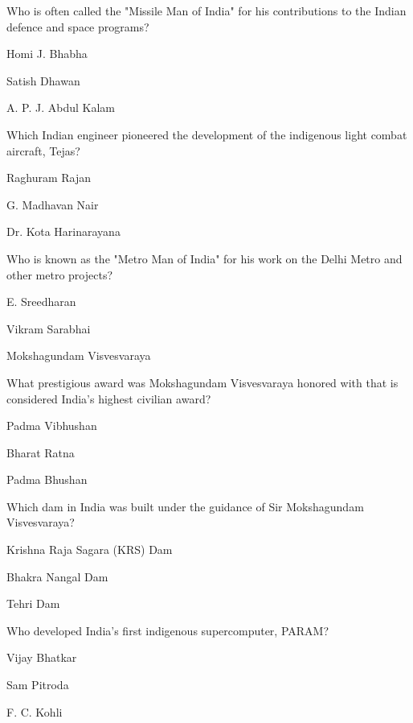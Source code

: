 \begin{enhancedmcq}{Who is often called the "Missile Man of India" for his contributions to the Indian defence and space programs?}
\item Homi J. Bhabha
\item Satish Dhawan
\item A. P. J. Abdul Kalam

\end{enhancedmcq}
\begin{enhancedmcq}{Which Indian engineer pioneered the development of the indigenous light combat aircraft, Tejas?}
\item Raghuram Rajan
\item G. Madhavan Nair
\item Dr. Kota Harinarayana

\end{enhancedmcq}
\begin{enhancedmcq}{Who is known as the "Metro Man of India" for his work on the Delhi Metro and other metro projects?}
\item E. Sreedharan
\item Vikram Sarabhai
\item Mokshagundam Visvesvaraya

\end{enhancedmcq}
\begin{enhancedmcq}{What prestigious award was Mokshagundam Visvesvaraya honored with that is considered India's highest civilian award?}
\item Padma Vibhushan
\item Bharat Ratna
\item Padma Bhushan

\end{enhancedmcq}
\begin{enhancedmcq}{Which dam in India was built under the guidance of Sir Mokshagundam Visvesvaraya?}
\item Krishna Raja Sagara (KRS) Dam
\item Bhakra Nangal Dam
\item Tehri Dam

\end{enhancedmcq}
\begin{enhancedmcq}{Who developed India's first indigenous supercomputer, PARAM?}
\item Vijay Bhatkar
\item Sam Pitroda
\item F. C. Kohli

\end{enhancedmcq}
